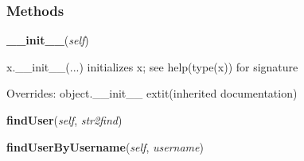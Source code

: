 
  \subsubsection{Methods}

    \vspace{0.5ex}

\hspace{.8\funcindent}\begin{boxedminipage}{\funcwidth}

    \raggedright \textbf{\_\_init\_\_}(\textit{self})

\setlength{\parskip}{2ex}
    x.\_\_init\_\_(...) initializes x; see help(type(x)) for signature

\setlength{\parskip}{1ex}
      Overrides: object.\_\_init\_\_ 	extit{(inherited documentation)}

    \end{boxedminipage}

    \label{config_db:Database:findUser}

    \vspace{0.5ex}

\hspace{.8\funcindent}\begin{boxedminipage}{\funcwidth}

    \raggedright \textbf{findUser}(\textit{self}, \textit{str2find})

\setlength{\parskip}{2ex}
\setlength{\parskip}{1ex}
    \end{boxedminipage}

    \label{config_db:Database:findUserByUsername}

    \vspace{0.5ex}

\hspace{.8\funcindent}\begin{boxedminipage}{\funcwidth}

    \raggedright \textbf{findUserByUsername}(\textit{self}, \textit{username})

\setlength{\parskip}{2ex}
\setlength{\parskip}{1ex}
    \end{boxedminipage}

